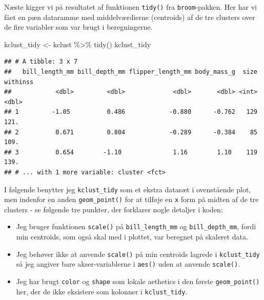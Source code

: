 \documentclass[
]{book}
\newenvironment{Shaded}{\begin{snugshade}}{\end{snugshade}}
\newcommand{\FunctionTok}[1]{\textcolor[rgb]{0.00,0.00,0.00}{#1}}
\newcommand{\NormalTok}[1]{#1}
\newcommand{\OtherTok}[1]{\textcolor[rgb]{0.56,0.35,0.01}{#1}}
\newcommand{\SpecialCharTok}[1]{\textcolor[rgb]{0.00,0.00,0.00}{#1}}
\providecommand{\tightlist}{%
  \setlength{\itemsep}{0pt}\setlength{\parskip}{0pt}}
\begin{document}
Næste kigger vi på resultatet af funktionen \texttt{tidy()} fra \texttt{broom}-pakken. Her har vi fået en pæn dataramme med middelværdierne (centroids) af de tre clusters over de fire variabler som var brugt i beregningerne.

\begin{Shaded}
\begin{Highlighting}[]
\NormalTok{kclust\_tidy }\OtherTok{\textless{}{-}}\NormalTok{ kclust }\SpecialCharTok{\%\textgreater{}\%} \FunctionTok{tidy}\NormalTok{()}
\NormalTok{kclust\_tidy}
\end{Highlighting}
\end{Shaded}

\begin{verbatim}
## # A tibble: 3 x 7
##   bill_length_mm bill_depth_mm flipper_length_mm body_mass_g  size withinss
##            <dbl>         <dbl>             <dbl>       <dbl> <int>    <dbl>
## 1         -1.05          0.486            -0.880      -0.762   129     121.
## 2          0.671         0.804            -0.289      -0.384    85     109.
## 3          0.654        -1.10              1.16        1.10    119     139.
## # ... with 1 more variable: cluster <fct>
\end{verbatim}

I følgende benytter jeg \texttt{kclust\_tidy} som et ekstra datasæt i ovenstående plot, men indenfor en anden \texttt{geom\_point()} for at tilføje en \texttt{x} form på midten af de tre clusters - se følgende tre punkter, der forklarer nogle detaljer i koden:

\begin{itemize}
\tightlist
\item
  Jeg bruger funktionen \texttt{scale()} på \texttt{bill\_length\_mm} og \texttt{bill\_depth\_mm}, fordi min centroids, som også skal med i plottet, var beregnet på skaleret data.
\item
  Jeg behøver ikke at anvende \texttt{scale()} på min centroids lagrede i \texttt{kclust\_tidy} så jeg angiver bare akser-variablerne i \texttt{aes()} uden at anvende \texttt{scale()}.
\item
  Jeg har brugt \texttt{color} og \texttt{shape} som lokale aethetics i den første \texttt{geom\_point()} her, der de ikke eksistere som kolonner i \texttt{kclust\_tidy}.
\end{itemize}
\end{document}
